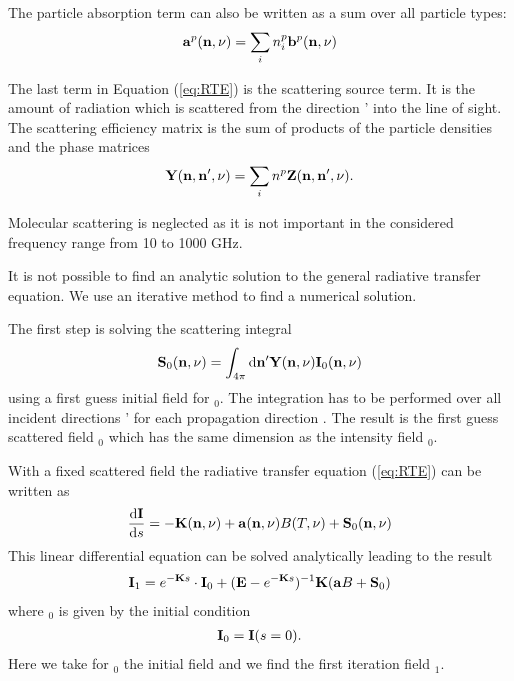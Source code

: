 The particle absorption term can also be written as a sum over all
particle types:
\begin{eqnarray}
  {\bf a}^{p}({\bf n}, \nu) = \sum_i n^p_i {\bf b}^{p} ({\bf n}, \nu)
\end{eqnarray}

The last term in Equation (\ref{eq:RTE}) is the scattering source
term. It is the 
amount of radiation which is scattered from the direction \PDir'   
into the line of sight.  The scattering efficiency matrix
\SEfMat is the sum of products  
of the particle densities \PDen  and the phase matrices \PhaMat
\begin{eqnarray}
{\bf Y}({\bf n}, {\bf n}', \nu) = \sum_i{n^p{\bf Z}({\bf n}, {\bf n}', \nu)}.
\end{eqnarray}

Molecular scattering is neglected as it is not important in the 
considered frequency range from 10 to 1000 GHz. 


\label{sec:scattering:solution_rte}

It is not possible to find an analytic solution to the general
radiative transfer equation. We use an iterative method to find a
numerical solution.

\label{sec:scattering:scat_int}

The first step is solving the scattering integral
\begin{eqnarray}
  {\bf S}_0 ({\bf n}, \nu)  = \int_{4\pi} \mathrm{d} {\bf n}' {\bf Y}({\bf n}, \nu) {\bf I}_0({\bf n}, \nu) 
\end{eqnarray}
using a first guess initial field for \StoVec$_0$\DirFre. The integration
has to be performed over all incident directions \PDir' for each
propagation direction \PDir. The result is the first guess scattered field \ScaInt$_0$\DirFre
which has the same dimension as the intensity field \StoVec$_0$\DirFre. 

\label{sec:scattering:RTE}
With a fixed scattered field \ScaInt\DirFre the radiative transfer
equation (\ref{eq:RTE}) can be written as
\begin{eqnarray}
     \frac{\mathrm{d} {\bf I}}{\mathrm{d} s} =
     -{\bf K}({\bf n}, \nu)+{\bf a}({\bf n}, \nu) B(T, \nu)
     +{\bf S}_0({\bf n}, \nu)
\end{eqnarray} 
This linear differential equation can be solved analytically leading
to the result
\begin{eqnarray}
  \label{eq:scattering:RTE_sol}
  {\bf I}_1 = e^{-{\bf K} s}\cdot{\bf I}_0 + ({\bf E} - e^{-{\bf K}
    s})^{-1}{{\bf K}} ({\bf a} B + {\bf S}_0)
\end{eqnarray}
where \StoVec$_0$ is given by the initial condition
\begin{eqnarray}
  {\bf I}_0 =  {\bf I}(s = 0).
\end{eqnarray}
Here we take for \StoVec$_0$ the initial field and we find the first
iteration field \StoVec$_1$.

